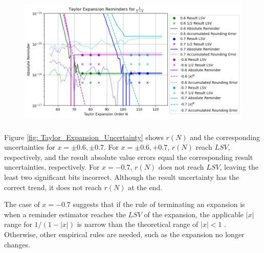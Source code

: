 \documentclass[twoside]{article}
\numberwithin{equation}{section}
\begin{document}
\begin{figure}[p]
\centering
\includegraphics[height=2.5in]{Taylor_Expansion.png} 
\label{fig: Taylor_Expansion}
\end{figure}


Figure \ref{fig: Taylor_Expansion_Uncertainty} shows $r(N)$ and the corresponding uncertainties for $x = \pm 0.6, \pm 0.7$.
For $x = \pm 0.6, +0.7$, $r(N)$ reach $LSV$, respectively, and the result absolute value errors equal the corresponding result uncertainties, respectively. 
For $x = -0.7$, $r(N)$ does not reach $LSV$, leaving the least two significant bits incorrect.
Although the result uncertainty has the correct trend, it does not reach $r(N)$ at the end.

The case of $x = -0.7$ suggests that if the rule of terminating an expansion is when a reminder estimator reaches the $LSV$ of the expansion, the applicable $|x|$ range for $1/(1 - |x|)$ is narrow than the theoretical range of $|x| < 1$ .
Otherwise, other empirical rules are needed, such as the expansion no longer changes.
\end{document}
